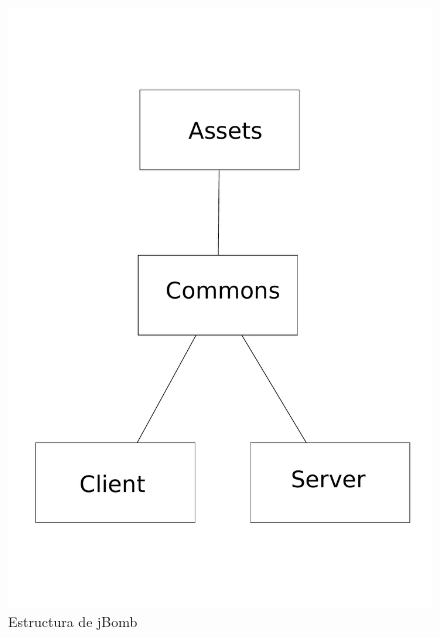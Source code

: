 \documentclass[a4paper,12pt,openany,oneside]{book}
\begin{document}
\begin{figure}[!hbp]
\begin{center}
\includegraphics[scale=0.4]{estructura.pdf}
\caption[Estructura jBomb]{Estructura de jBomb}
\end{center} 
\end{figure}
\end{document}
